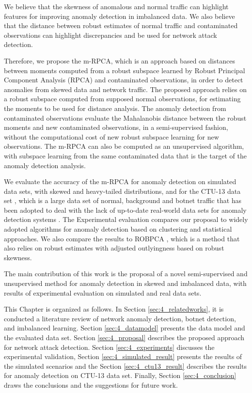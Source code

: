 {We believe that the skewness of anomalous and normal traffic can highlight features for improving anomaly detection in imbalanced data. We also believe that the distance between robust estimates of normal traffic and contaminated observations can highlight discrepancies and be used for network attack detection. 

Therefore, we propose the m-RPCA, which is an approach based on distances between moments computed from a robust subspace learned by Robust Principal Component Analysis (RPCA) and contaminated observations, in order to detect anomalies from skewed data and network traffic. The proposed approach relies on a robust subspace computed from supposed normal observations, for estimating the moments to be used for distance analysis. The anomaly detection from contaminated observations evaluate the Mahalanobis distance between the robust moments and new contaminated observations, in a semi-supervised fashion, without the computational cost of new robust subspace learning for new observations. The m-RPCA can also be computed as an unsupervised algorithm, with subspace learning from the same contaminated data that is the target of the anomaly detection analysis.

We evaluate the accuracy of the m-RPCA for anomaly detection on simulated data sets, with skewed and heavy-tailed distributions, and for the CTU-13 data set \cite{garcia2014empirical}, which is a large data set of normal, background and botnet traffic that has been adopted to deal with the lack of up-to-date real-world data sets for anomaly detection systems \cite{osanaiye2016distributed}. The Experimental evaluation compares our proposal to widely adopted algorithms for anomaly detection based on clustering and statistical approaches. We also compare the results to ROBPCA \cite{hubert2005robpca}, which is a method that also relies on robust estimates with adjusted outlyingness based on robust skewness.

The main contribution of this work is the proposal of a novel semi-supervised and unsupervised method for anomaly detection in skewed and imbalanced data, with results of experimental evaluation on simulated and real data sets.

This Chapter is organized as follows. In Section \ref{sec:4_relatedworks}, it is conducted a literature review of network anomaly detection, botnet detection, and imbalanced learning. Section \ref{sec:4_datamodel} presents the data model and the evaluated data set. Section \ref{sec:4_proposal} describes the proposed approach for network attack detection. Section \ref{sec:4_experiments} discusses the experimental validation, Section \ref{sec:4_simulated_result} presents the results of the simulated scenarios and the Section \ref{sec:4_ctu13_result} describes the results for anomaly detection on CTU-13 data set. Finally, Section \ref{sec:4_conclusion} draws the conclusions and the suggestions for future work.

}
